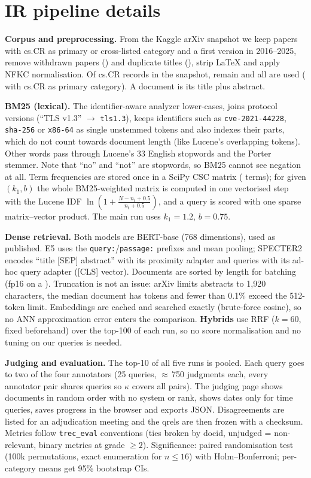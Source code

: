 \documentclass[10pt,a4paper]{article}
\begin{document}
\section{IR pipeline details}
\textbf{Corpus and preprocessing.} From the Kaggle arXiv snapshot we keep papers with cs.CR as
primary or cross-listed category and a first version in 2016--2025, remove withdrawn papers
(\corpusWithdrawn{}) and duplicate titles (\corpusDup{}), strip LaTeX and apply NFKC normalisation.
Of \corpusInCat{} cs.CR records in the snapshot, \corpusN{} remain and all are used
(\corpusPrimary{} with cs.CR as primary category). A document is its title plus abstract.

\textbf{BM25 (lexical).} The identifier-aware analyzer lower-cases, joins protocol versions
(``TLS v1.3'' $\to$ \texttt{tls1.3}), keeps identifiers such as \texttt{cve-2021-44228},
\texttt{sha-256} or \texttt{x86-64} as single unstemmed tokens and also indexes their parts,
which do not count towards document length (like Lucene's overlapping tokens). Other words
pass through Lucene's 33 English stopwords and the Porter stemmer. Note that ``no'' and ``not''
are stopwords, so BM25 cannot see negation at all. Term frequencies are stored once in a SciPy
CSC matrix (\bmVocab{} terms); for given $(k_1,b)$ the whole BM25-weighted matrix is computed in
one vectorised step with the Lucene IDF $\ln(1+\frac{N-n_t+0.5}{n_t+0.5})$, and a query is
scored with one sparse matrix--vector product. The main run uses $k_1{=}1.2$, $b{=}0.75$.

\textbf{Dense retrieval.} Both models are BERT-base (768 dimensions), used as published.
E5 uses the \texttt{query:}/\texttt{passage:} prefixes and mean pooling; SPECTER2 encodes
``title [SEP] abstract'' with its proximity adapter and queries with its ad-hoc query adapter
([CLS] vector). Documents are sorted by length for batching (fp16 on a \gpuName{}). Truncation is not an issue:
arXiv limits abstracts to 1{,}920 characters, the median document has \medTokEfive{} tokens and
fewer than 0.1\% exceed the 512-token limit.
Embeddings are cached and searched exactly (brute-force cosine), so no ANN approximation error
enters the comparison. \textbf{Hybrids} use RRF ($k{=}60$, fixed beforehand) over the top-100 of
each run, so no score normalisation and no tuning on our queries is needed.

\textbf{Judging and evaluation.} The top-10 of all five runs is pooled. Each query goes to two
of the four annotators (25 queries, $\approx$\,750 judgments each, every annotator pair shares
queries so $\kappa$ covers all pairs). The judging page shows documents in random order with no
system or rank, shows dates only for time queries, saves progress in the browser and exports JSON.
Disagreements are listed for an adjudication meeting and the qrels are then frozen with a checksum.
Metrics follow \texttt{trec\_eval} conventions (ties broken by docid, unjudged = non-relevant,
binary metrics at grade $\geq 2$). Significance: paired randomisation test (100k permutations,
exact enumeration for $n\leq 16$) with Holm--Bonferroni; per-category means get 95\% bootstrap CIs.
\end{document}
